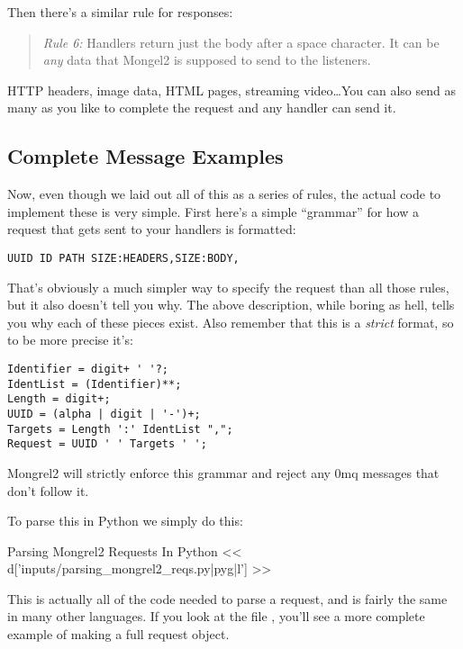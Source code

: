 Then there's a similar rule for responses:

\begin{quote}
\emph{Rule 6:} Handlers return just the body after a space character.  It can be \emph{any}
    data that Mongel2 is supposed to send to the listeners.
\end{quote}

HTTP headers, image data, HTML pages, streaming video\ldots You can also send as
many as you like to complete the request and any handler can send it.


\subsection{Complete Message Examples}

Now, even though we laid out all of this as a series of rules, the actual code to implement
these is very simple.  First here's a simple ``grammar'' for how a request that
gets sent to your handlers is formatted:

\begin{Verbatim}
UUID ID PATH SIZE:HEADERS,SIZE:BODY,
\end{Verbatim}

That's obviously a much simpler way to specify the request than all those
rules, but it also doesn't tell you why.  The above description, while
boring as hell, tells you why each of these pieces exist.  Also remember
that this is a \emph{strict} format, so to be more precise it's:

\begin{Verbatim}
Identifier = digit+ ' '?;
IdentList = (Identifier)**;
Length = digit+;
UUID = (alpha | digit | '-')+;
Targets = Length ':' IdentList ",";
Request = UUID ' ' Targets ' ';
\end{Verbatim}

Mongrel2 will strictly enforce this grammar and reject any 0mq messages that
don't follow it.

To parse this in Python we simply do this:

\begin{code}{Parsing Mongrel2 Requests In Python}
<< d['inputs/parsing_mongrel2_reqs.py|pyg|l'] >>
\end{code}

This is actually all of the code needed to parse a request, and is
fairly the same in many other languages.  If you look at the file
, you'll see a more complete
example of making a full request object.

